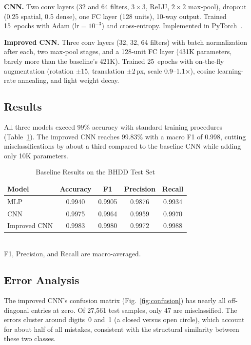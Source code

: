 \documentclass[conference]{IEEEtran}
\begin{document}
\textbf{CNN.} Two conv layers (32 and 64 filters, $3\times3$, ReLU,
$2\times2$ max-pool), dropout (0.25 spatial, 0.5 dense), one FC layer
(128 units), 10-way output. Trained 15~epochs with Adam
($\text{lr}=10^{-3}$) and cross-entropy. Implemented in
PyTorch~\cite{paszke2019pytorch}.

\textbf{Improved CNN.} Three conv layers (32, 32, 64 filters) with
batch normalization after each, two max-pool stages, and a 128-unit FC
layer (431K parameters, barely more than the baseline's 421K). Trained
25~epochs with on-the-fly augmentation (rotation $\pm$15\textdegree,
translation $\pm$2\,px, scale 0.9--1.1$\times$), cosine learning-rate
annealing, and light weight decay.

\subsection{Results}

All three models exceed 99\% accuracy with standard training
procedures (Table~\ref{tab:results}). The improved CNN reaches 99.83\%
with a macro F1 of 0.998, cutting misclassifications by about a third
compared to the baseline CNN while adding only 10K parameters.

\begin{table}[!t]
  \centering
  \caption{Baseline Results on the BHDD Test Set}
  \label{tab:results}
  \begin{tabular}{lcccc}
    \toprule
    Model & Accuracy & F1 & Precision & Recall \\
    \midrule
    MLP          & 0.9940 & 0.9905 & 0.9876 & 0.9934 \\
    CNN          & 0.9975 & 0.9964 & 0.9959 & 0.9970 \\
    Improved CNN & 0.9983 & 0.9980 & 0.9972 & 0.9988 \\
    \bottomrule
  \end{tabular}\\[2pt]
  {\small F1, Precision, and Recall are macro-averaged.}
\end{table}

\subsection{Error Analysis}
\label{sec:error}

The improved CNN's confusion matrix (Fig.~\ref{fig:confusion}) has
nearly all off-diagonal entries at zero. Of 27,561 test samples, only
47 are misclassified. The errors
cluster around digits~0 and~1 (a closed versus open circle), which
account for about half of all mistakes, consistent with the
structural similarity between these two classes.
\end{document}
